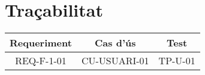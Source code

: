 \section{Traçabilitat}\label{sec:intro}

\begin{center}
\begin{tabular}{|c|c|c|}
\hline
{\cellcolor[gray]{.8} \bf Requeriment} & {\cellcolor[gray]{.8} \bf Cas d'ús} & {\cellcolor[gray]{.8} \bf Test}  \\
\hline
REQ-F-1-01 & CU-USUARI-01 & TP-U-01 \\
\hline
\end{tabular}
\end{center}
